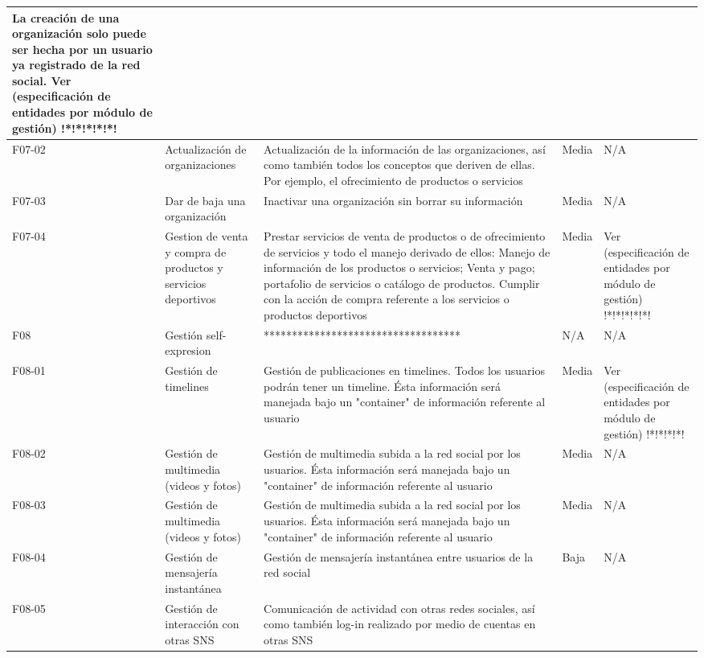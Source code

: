 \begin{table}[!htb]
\begin{center}
\begin{supertabular}{|p{1cm}|p{4cm}|p{4cm}|p{2cm}|p{4cm}|}
			La creación de una organización solo puede ser hecha por un usuario ya registrado de la red social. Ver (especificación de entidades por módulo de gestión) !*!*!*!*!*!\\
			\hline
			F07-02 & 
			Actualización de organizaciones & 
			Actualización de la información de las organizaciones, así como también todos los conceptos que deriven de ellas. Por ejemplo, el ofrecimiento de productos o servicios &
			Media & 
			N/A \\
			\hline
			F07-03 & 
			Dar de baja una organización & 
			Inactivar una organización sin borrar su información &
			Media & 
			N/A \\
			\hline
			F07-04 & 
			Gestion de venta y compra de productos y servicios deportivos & 
			Prestar servicios de venta de productos o de ofrecimiento de servicios y todo el manejo
derivado de ellos: Manejo de información de los productos o servicios; Venta y pago; portafolio de servicios o catálogo de productos. Cumplir con la acción de compra referente a los servicios o productos deportivos &
			Media & 
			Ver (especificación de entidades por módulo de gestión) !*!*!*!*!*! \\
			\hline
			F08 & 
			Gestión self-expresion & 
			*********************************** &
			N/A & 
			N/A \\
			\hline
			F08-01 & 
			Gestión de timelines & 
			Gestión de publicaciones en timelines. Todos los usuarios podrán tener un timeline. Ésta información será manejada bajo un "container" de información referente al usuario &
			Media & 
			Ver (especificación de entidades por módulo de gestión) !*!*!*!*!\\
			\hline
			F08-02 & 
			Gestión de multimedia (videos y fotos) & 
			Gestión de multimedia subida a la red social por los usuarios. Ésta información será manejada bajo un "container" de información referente al usuario &
			Media & 
			N/A \\
			\hline
			F08-03 & 
			Gestión de multimedia (videos y fotos) & 
			Gestión de multimedia subida a la red social por los usuarios. Ésta información será manejada bajo un "container" de información referente al usuario &
			Media & 
			N/A \\
			\hline
			F08-04 & 
			Gestión de mensajería instantánea & 
			Gestión de mensajería instantánea entre usuarios de la red social &
			Baja & 
			N/A \\
			\hline
			F08-05 & 
			Gestión de interacción con otras SNS & 
			Comunicación de actividad con otras redes sociales, así como también log-in realizado por medio de cuentas en otras SNS &

\end{supertabular}
\end{center}
\end{table}
